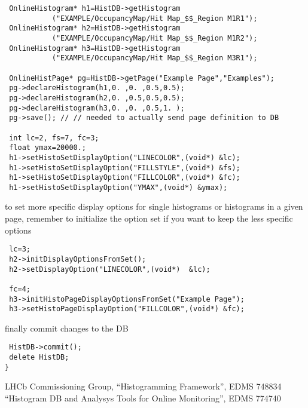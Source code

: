 \documentclass{lhcbnote}
\begin{document}
\begin{verbatim}
 OnlineHistogram* h1=HistDB->getHistogram
           ("EXAMPLE/OccupancyMap/Hit Map_$$_Region M1R1");
 OnlineHistogram* h2=HistDB->getHistogram
           ("EXAMPLE/OccupancyMap/Hit Map_$$_Region M1R2");
 OnlineHistogram* h3=HistDB->getHistogram
           ("EXAMPLE/OccupancyMap/Hit Map_$$_Region M3R1");

 OnlineHistPage* pg=HistDB->getPage("Example Page","Examples");
 pg->declareHistogram(h1,0. ,0. ,0.5,0.5);
 pg->declareHistogram(h2,0. ,0.5,0.5,0.5);
 pg->declareHistogram(h3,0. ,0. ,0.5,1. );
 pg->save(); // // needed to actually send page definition to DB

 int lc=2, fs=7, fc=3;
 float ymax=20000.;
 h1->setHistoSetDisplayOption("LINECOLOR",(void*) &lc);
 h1->setHistoSetDisplayOption("FILLSTYLE",(void*) &fs);
 h1->setHistoSetDisplayOption("FILLCOLOR",(void*) &fc); 
 h1->setHistoSetDisplayOption("YMAX",(void*) &ymax); 
 \end{verbatim}
to set more specific display options for single histograms or
histograms in a given page, remember to initialize the option set if
you want to keep the less specific options
\begin{verbatim}
 lc=3;
 h2->initDisplayOptionsFromSet();
 h2->setDisplayOption("LINECOLOR",(void*)  &lc);

 fc=4;
 h3->initHistoPageDisplayOptionsFromSet("Example Page");
 h3->setHistoPageDisplayOption("FILLCOLOR",(void*) &fc);
\end{verbatim}
finally commit changes to the DB
\begin{verbatim}
 HistDB->commit();
 delete HistDB;
}
\end{verbatim}


\begin{thebibliography}{99}
LHCb Commissioning Group, ``Histogramming Framework'', EDMS 748834
``Histogram DB and Analysys Tools for Online Monitoring'', EDMS 774740

\end{thebibliography}
\end{document}

